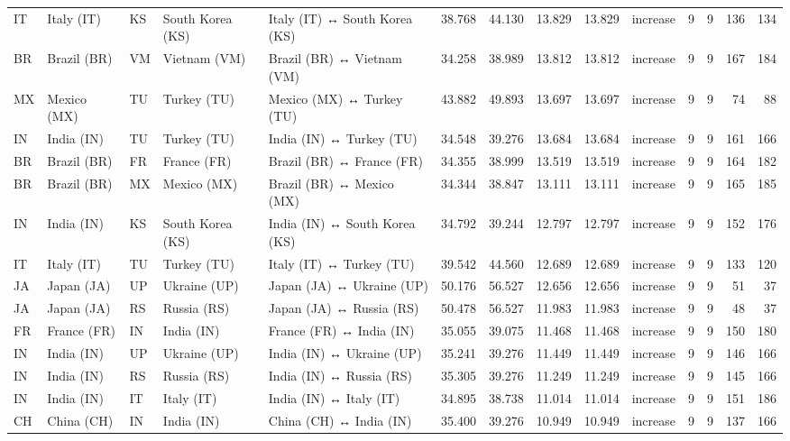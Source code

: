 \begin{tabular}{lllllrrrrlrrrr}
IT & Italy (IT) & KS & South Korea (KS) & Italy (IT) ↔ South Korea (KS) & 38.768 & 44.130 & 13.829 & 13.829 & increase & 9 & 9 & 136 & 134 \\
BR & Brazil (BR) & VM & Vietnam (VM) & Brazil (BR) ↔ Vietnam (VM) & 34.258 & 38.989 & 13.812 & 13.812 & increase & 9 & 9 & 167 & 184 \\
MX & Mexico (MX) & TU & Turkey (TU) & Mexico (MX) ↔ Turkey (TU) & 43.882 & 49.893 & 13.697 & 13.697 & increase & 9 & 9 & 74 & 88 \\
IN & India (IN) & TU & Turkey (TU) & India (IN) ↔ Turkey (TU) & 34.548 & 39.276 & 13.684 & 13.684 & increase & 9 & 9 & 161 & 166 \\
BR & Brazil (BR) & FR & France (FR) & Brazil (BR) ↔ France (FR) & 34.355 & 38.999 & 13.519 & 13.519 & increase & 9 & 9 & 164 & 182 \\
BR & Brazil (BR) & MX & Mexico (MX) & Brazil (BR) ↔ Mexico (MX) & 34.344 & 38.847 & 13.111 & 13.111 & increase & 9 & 9 & 165 & 185 \\
IN & India (IN) & KS & South Korea (KS) & India (IN) ↔ South Korea (KS) & 34.792 & 39.244 & 12.797 & 12.797 & increase & 9 & 9 & 152 & 176 \\
IT & Italy (IT) & TU & Turkey (TU) & Italy (IT) ↔ Turkey (TU) & 39.542 & 44.560 & 12.689 & 12.689 & increase & 9 & 9 & 133 & 120 \\
JA & Japan (JA) & UP & Ukraine (UP) & Japan (JA) ↔ Ukraine (UP) & 50.176 & 56.527 & 12.656 & 12.656 & increase & 9 & 9 & 51 & 37 \\
JA & Japan (JA) & RS & Russia (RS) & Japan (JA) ↔ Russia (RS) & 50.478 & 56.527 & 11.983 & 11.983 & increase & 9 & 9 & 48 & 37 \\
FR & France (FR) & IN & India (IN) & France (FR) ↔ India (IN) & 35.055 & 39.075 & 11.468 & 11.468 & increase & 9 & 9 & 150 & 180 \\
IN & India (IN) & UP & Ukraine (UP) & India (IN) ↔ Ukraine (UP) & 35.241 & 39.276 & 11.449 & 11.449 & increase & 9 & 9 & 146 & 166 \\
IN & India (IN) & RS & Russia (RS) & India (IN) ↔ Russia (RS) & 35.305 & 39.276 & 11.249 & 11.249 & increase & 9 & 9 & 145 & 166 \\
IN & India (IN) & IT & Italy (IT) & India (IN) ↔ Italy (IT) & 34.895 & 38.738 & 11.014 & 11.014 & increase & 9 & 9 & 151 & 186 \\
CH & China (CH) & IN & India (IN) & China (CH) ↔ India (IN) & 35.400 & 39.276 & 10.949 & 10.949 & increase & 9 & 9 & 137 & 166 \\

\end{tabular}
